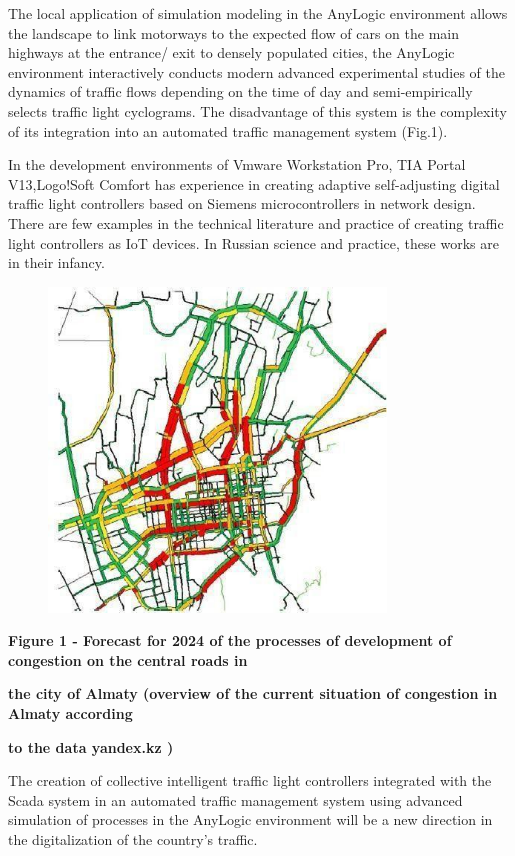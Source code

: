 The local application of simulation modeling in the AnyLogic environment
allows the landscape to link motorways to the expected flow of cars on
the main highways at the entrance/ exit to densely populated cities, the
AnyLogic environment interactively conducts modern advanced experimental
studies of the dynamics of traffic flows depending on the time of day
and semi-empirically selects traffic light cyclograms. The disadvantage
of this system is the complexity of its integration into an automated
traffic management system (Fig.1).

In the development environments of Vmware Workstation Pro, TIA Portal
V13,Logo!Soft Comfort has experience in creating adaptive self-adjusting
digital traffic light controllers based on Siemens microcontrollers in
network design. There are few examples in the technical literature and
practice of creating traffic light controllers as IoT devices. In
Russian science and practice, these works are in their infancy.

\begin{figure}[H]
	\centering
	\includegraphics[width=0.8\textwidth]{assets/73}
	\caption*{}
\end{figure}

\textbf{Figure 1 - Forecast for 2024 of the processes of development of
congestion on the central roads in}

\textbf{the city of Almaty (overview of the current situation of
congestion in Almaty according}

\textbf{to the data yandex.kz )}

The creation of collective intelligent traffic light controllers
integrated with the Scada system in an automated traffic management
system using advanced simulation of processes in the AnyLogic
environment will be a new direction in the digitalization of the
country's traffic.

